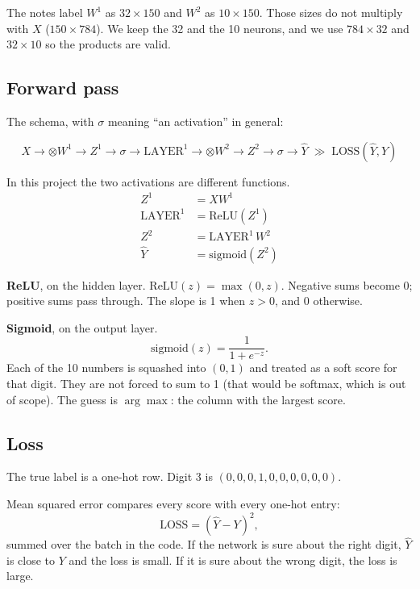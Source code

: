\documentclass[11pt]{article}
\begin{document}
The notes label $W^{1}$ as $32\times 150$ and $W^{2}$ as $10\times 150$. Those sizes do not multiply with $X$ ($150\times 784$). We keep the 32 and the 10 neurons, and we use $784\times 32$ and $32\times 10$ so the products are valid.

\subsection*{Forward pass}

The schema, with $\sigma$ meaning ``an activation'' in general:

\begin{tcolorbox}[prd, title=Forward schema]
\[
X \rightarrow \otimes W^{1} \rightarrow Z^{1} \rightarrow \sigma \rightarrow \mathrm{LAYER}^{1}
\rightarrow \otimes W^{2} \rightarrow Z^{2} \rightarrow \sigma \rightarrow \hat{Y}
\;\gg\; \mathrm{LOSS}(\hat{Y}, Y)
\]
\end{tcolorbox}

In this project the two activations are different functions.
\begin{align*}
Z^{1} &= X W^{1} \\
\mathrm{LAYER}^{1} &= \mathrm{ReLU}(Z^{1}) \\
Z^{2} &= \mathrm{LAYER}^{1}\, W^{2} \\
\hat{Y} &= \mathrm{sigmoid}(Z^{2})
\end{align*}

\textbf{ReLU}, on the hidden layer. $\mathrm{ReLU}(z)=\max(0,z)$. Negative sums become 0; positive sums pass through. The slope is 1 when $z>0$, and 0 otherwise.

\textbf{Sigmoid}, on the output layer.
\[
\mathrm{sigmoid}(z)=\frac{1}{1+e^{-z}}.
\]
Each of the 10 numbers is squashed into $(0,1)$ and treated as a soft score for that digit. They are not forced to sum to 1 (that would be softmax, which is out of scope). The guess is $\arg\max$: the column with the largest score.

\subsection*{Loss}

The true label is a one-hot row. Digit 3 is $(0,0,0,1,0,0,0,0,0,0)$.

Mean squared error compares every score with every one-hot entry:
\[
\mathrm{LOSS}=(\hat{Y}-Y)^{2},
\]
summed over the batch in the code. If the network is sure about the right digit, $\hat{Y}$ is close to $Y$ and the loss is small. If it is sure about the wrong digit, the loss is large.
\end{document}
